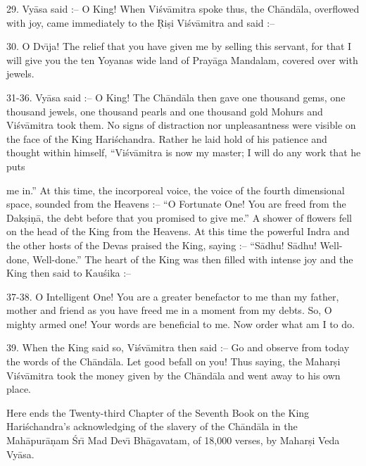 29. Vy\=asa said :-- O King! When Vi\'sv\=amitra spoke thus, the Ch\=and\=ala, overflowed with joy, came immediately to the \d{R}i\d{s}i Vi\'sv\=amitra and said :--

30. O Dv\={\i}ja! The relief that you have given me by selling this servant, for that I will give you the ten Yoyanas wide land of Pray\=aga Mandalam, covered over with jewels.

31-36. Vy\=asa said :-- O King! The Ch\=and\=ala then gave one thousand gems, one thousand jewels, one thousand pearls and one thousand gold Mohurs and Vi\'sv\=amitra took them. No signs of distraction nor unpleasantness were visible on the face of the King Hari\'schandra. Rather he laid hold of his patience and thought within himself, ``Vi\'sv\=amitra is now my master; I will do any work that he puts

me in.'' At this time, the incorporeal voice, the voice of the fourth dimensional space, sounded from the Heavens :-- ``O Fortunate One! You are freed from the Dak\d{s}i\d{n}\=a, the debt before that you promised to give me.'' A shower of flowers fell on the head of the King from the Heavens. At this time the powerful Indra and the other hosts of the Devas praised the King, saying :-- ``S\=adhu! S\=adhu! Well-done, Well-done.'' The heart of the King was then filled with intense joy and the King then said to Kau\'sika :--

37-38. O Intelligent One! You are a greater benefactor to me than my father, mother and friend as you have freed me in a moment from my debts. So, O mighty armed one! Your words are beneficial to me. Now order what am I to do.

39. When the King said so, Vi\'sv\=amitra then said :-- Go and observe from today the words of the Ch\=and\=ala. Let good befall on you! Thus saying, the Mahar\d{s}i Vi\'sv\=amitra took the money given by the Ch\=and\=ala and went away to his own place.

Here ends the Twenty-third Chapter of the Seventh Book on the King Hari\'schandra's acknowledging of the slavery of the Ch\=and\=ala in the Mah\=apur\=a\d{n}am \'Sr\={\i} Mad Dev\={\i} Bh\=agavatam, of 18,000 verses, by Mahar\d{s}i Veda Vy\=asa.



